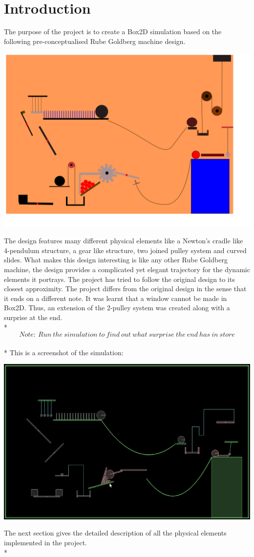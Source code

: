 \documentclass[11pt]{article}
\begin{document}
\section{Introduction}
The purpose of the project is to create a Box2D simulation based on the following pre-conceptualised Rube Goldberg machine design\cite{rube_g}.
\begin{center}
\includegraphics[scale=0.4]{design}
\end{center}
The design features many different physical elements like a Newton's cradle like 4-pendulum structure, a gear like structure, two joined pulley system and curved slides. What makes this design interesting is like any other Rube Goldberg machine, the design provides a complicated yet elegant trajectory for the dynamic elements it portrays. The project has tried to follow the original design to its closest approximity. The project differs from the original design in the sense that it ends on a different note. It was learnt that a window cannot be made in Box2D. Thus, an extension of the 2-pulley system was created along with a surprise at the end. \\*
\[Note:\ Run\ the\ simulation\ to\ find\ out\ what\ surprise\ the\ end\ has\ in\ store\]\\* This is a screenshot of the simulation:  
\begin{center}
\includegraphics[scale=0.5]{sim}
\end{center}
The next section gives the detailed description of all the physical elements implemented in the project.\\* 
\end{document}

